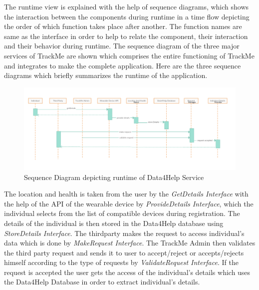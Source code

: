 The runtime view is explained with the help of sequence diagrams, which shows the interaction between the components during runtime in a time flow depicting the order of which function takes place after another. The function names are same as the interface in order to help to relate the component, their interaction and their behavior during runtime. The sequence diagram of the three major services of TrackMe are shown which comprises the entire functioning of TrackMe and integrates to make the complete application.\newline
Here are the three sequence diagrams which briefly summarizes the runtime of the application.
\begin{figure}[H]
	\begin{center}
		\includegraphics[width=\textwidth]{./DD_Diagrams/RuntimeData4Help.png}
      \caption{Sequence Diagram depicting runtime of Data4Help Service}
        \label{TrackMe_r1}
	\end{center}
\end{figure}
The location and health is taken from the user by the \textit{GetDetails Interface}  with the help of the API of the wearable device by \textit{ProvideDetails Interface}, which the individual selects from the list of compatible devices during registration. The details of the individual is then stored in the Data4Help database using \textit{StoreDetails Interface}.\newline
The thirdparty makes the request to access individual's data which is done by \textit{MakeRequest Interface}.\newline
The TrackMe Admin then validates the third party request and sends it to user to accept/reject or accepts/rejects himself according to the type of requests by \textit{ValidateRequest Interface}.\newline
If the request is accepted the user gets the access of the individual's details which uses the Data4Help Database in order to extract individual's details.
